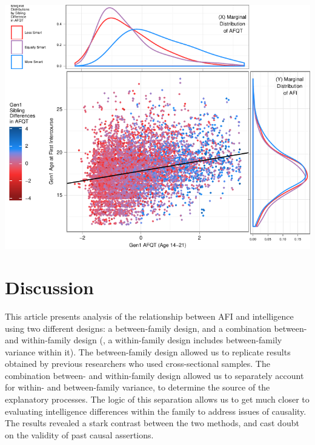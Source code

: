 \documentclass[a4paper,man,apacite,natbib,12pt,longtable]{apa6}\usepackage[]{graphicx}\usepackage[]{color}
\newenvironment{knitrout}{}{} %
\begin{document}
%
\begin{landscape}
\noindent\begin{minipage}{\linewidth}
\label{plot_gen1_afi}
\begin{center}
\begin{knitrout}
\color{fgcolor}
\includegraphics[width=.8\paperwidth]{figure/plot_gen1_afi-1} 

\end{knitrout}
\end{center}\end{minipage}\end{landscape}

\section{Discussion}
This article presents analysis of the relationship between AFI and intelligence using two different designs: a between-family design, and a combination between- and within-family design (\ie, a within-family design includes between-family variance within it). The between-family design allowed us to replicate results obtained by previous researchers who used cross-sectional samples. The combination between- and within-family design allowed us to separately account for within- and between-family variance, to determine the source of the explanatory processes.  The logic of this separation allows us to get much closer to evaluating intelligence differences within the family to address issues of causality. The results revealed a stark contrast between the two methods, and cast doubt on the validity of past causal assertions.
\end{document}
